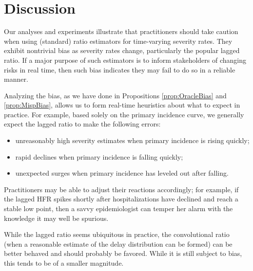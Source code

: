 \documentclass{article}
\renewcommand{\hat}{\widehat} %
\begin{document}

\section{Discussion}

Our analyses and experiments illustrate that practitioners should take caution
when using (standard) ratio estimators for time-varying severity rates. They
exhibit nontrivial bias as severity rates change, particularly the popular
lagged ratio. If a major purpose of such estimators is to inform stakeholders of
changing risks in real time, then such bias indicates they may fail to do so in
a reliable manner.

Analyzing the bias, as we have done in Propositions \ref{prop:OracleBias} and 
\ref{prop:MispBias}, allows us to form real-time heuristics about what to
expect in practice. For example, based solely on the primary incidence curve, we
generally expect the lagged ratio to make the following errors: 
\begin{itemize}
\item unreasonably high severity estimates when primary incidence is rising
  quickly; 
\item rapid declines when primary incidence is falling quickly; 
\item unexpected surges when primary incidence has leveled out after falling.  
\end{itemize}
Practitioners may be able to adjust their reactions accordingly; for example, if 
the lagged HFR spikes shortly after hospitalizations have declined and reach a
stable low point, then a savvy epidemiologist can temper her alarm with the
knowledge it may well be spurious.  

While the lagged ratio seems ubiquitous in practice, the convolutional ratio
(when  a reasonable estimate of the delay distribution can be formed) can be
better behaved and should probably be favored. While it is still subject to
bias, this tends to be of a smaller magnitude. 
\end{document}
